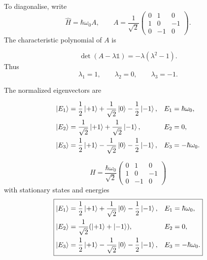 \documentclass[11pt,a4paper]{scrartcl}
\newcommand{\op}[1]{\hat{#1}}
\begin{document}
\begin{enumerate}[label=(\alph*)]
\begin{calculationbox}
            To diagonalise, write
            \[
                \op{H}=\hbar\omega_0 A,
                \qquad
                A=\frac{1}{\sqrt{2}}
                    \begin{pmatrix}
                        0&1&0\\
                        1&0&-1\\
                        0&-1&0
                    \end{pmatrix}.
            \]
            The characteristic polynomial of $A$ is
            \begin{calculationbox}
                \[
                    \det(A-\lambda\mathbb{1})
                    = -\lambda(\lambda^2-1).
                \]
                Thus
                \[
                    \lambda_1=1,
                    \qquad
                    \lambda_2=0,
                    \qquad
                    \lambda_3=-1.
                \]
            \end{calculationbox}

            The normalized eigenvectors are
            \begin{calculationbox}
                \begin{align*}
                    \ket{E_1}
                    &=\frac12\ket{+1}+\frac{1}{\sqrt{2}}\ket{0}-\frac12\ket{-1},
                    &E_1&=\hbar\omega_0,\\
                    \ket{E_2}
                    &=\frac{1}{\sqrt{2}}\ket{+1}+\frac{1}{\sqrt{2}}\ket{-1},
                    &E_2&=0,\\
                    \ket{E_3}
                    &=\frac12\ket{+1}-\frac{1}{\sqrt{2}}\ket{0}-\frac12\ket{-1},
                    &E_3&=-\hbar\omega_0.
                \end{align*}
            \end{calculationbox}
        \end{calculationbox}

        \begin{answerbox}
            \[
                \boxed{
                \op{H}=\frac{\hbar\omega_0}{\sqrt{2}}
                    \begin{pmatrix}
                        0&1&0\\
                        1&0&-1\\
                        0&-1&0
                    \end{pmatrix}}
            \]
            with stationary states and energies
            \[
                \boxed{
                \begin{aligned}
                    \ket{E_1}&=\frac12\ket{+1}+\frac{1}{\sqrt{2}}\ket{0}-\frac12\ket{-1}, & E_1&=\hbar\omega_0,\\
                    \ket{E_2}&=\frac{1}{\sqrt{2}}(\ket{+1}+\ket{-1}), & E_2&=0,\\
                    \ket{E_3}&=\frac12\ket{+1}-\frac{1}{\sqrt{2}}\ket{0}-\frac12\ket{-1}, & E_3&=-\hbar\omega_0.
                \end{aligned}}
            \]
        \end{answerbox}


\end{enumerate}
\end{document}
